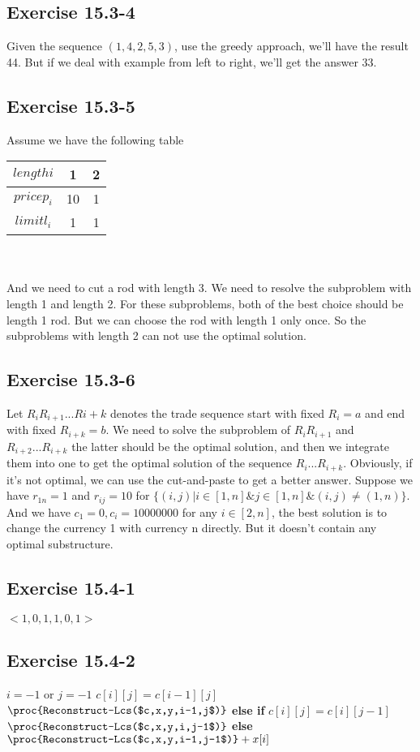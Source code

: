 \documentclass[12pt]{article}
\theoremstyle{definition}
\theoremstyle{remark}
\begin{document}
\subsection*{Exercise 15.3-4}
Given the sequence $(1,4,2,5,3)$, use the greedy approach, we'll have the result 44. But if we deal with example from left to right, we'll get the answer 33.
\subsection*{Exercise 15.3-5}
Assume we have the following table\\
\begin{tabular}{c|c|c}\hline
$length i$ & 1 & 2\\ \hline
$price p_i$ & 10 & 1\\ \hline
$limit l_i$ & 1 & 1\\ \hline
\end{tabular}\\\\
And we need to cut a rod with length 3. We need to resolve the subproblem with length 1 and length 2. For these subproblems, both of the best choice should be length 1 rod. But we can choose the rod with length 1 only once. So the subproblems with length 2 can not use the optimal solution.
\subsection*{Exercise 15.3-6}
Let $R_iR_{i+1}...R{i+k}$ denotes the trade sequence start with fixed $R_i=a$ and end with fixed $R_{i+k}=b$. We need to solve the subproblem of $R_iR_{i+1}$ and $R_{i+2}...R_{i+k}$ the latter should be the optimal solution, and then we integrate them into one to get the optimal solution of the sequence $R_i...R_{i+k}$. Obviously, if it's not optimal, we can use the cut-and-paste to get a better answer. Suppose we have $r_{1n}=1$ and $r_{ij}=10$ for $\{(i,j)|i\in[1,n]\&j\in[1,n]\&(i,j)\ne (1,n)\}$. And we have $c_1=0,c_i=10000000$ for any $i\in[2,n]$, the best solution is to change the currency 1 with currency n directly. But it doesn't contain any optimal substructure.
\subsection*{Exercise 15.4-1}
$<1,0,1,1,0,1>$
\subsection*{Exercise 15.4-2}
\begin{codebox}
\li \If $i=-1$ or $j=-1$
\li \quad \Return
\li \If $c[i][j]=c[i-1][j]$ \label{li:if}
\li \quad \Return $\proc{Reconstruct-Lcs($c,x,y,i-1,j$)}$
\li \textbf{else if} $c[i][j]=c[i][j-1]$
\li \quad \Return $\proc{Reconstruct-Lcs($c,x,y,i,j-1$)}$
\li \textbf{else}
\li \quad \Return $\proc{Reconstruct-Lcs($c,x,y,i-1,j-1$)}+x[i]$
\end{codebox}
\end{document}
